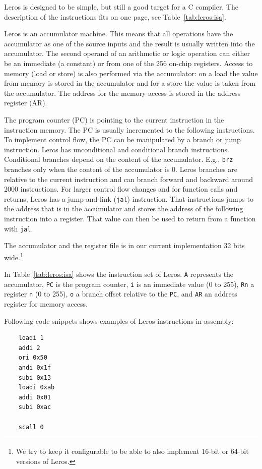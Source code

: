 \documentclass[%
    10pt,
    headinclude, footexclude,
    openright, %
    notitlepage,
    cleardoubleempty,
    headsepline,
    pointlessnumbers,
    bibtotoc, idxtotoc,
    ]{scrbook}
\newcommand{\code}[1]{{\lstinline[basicstyle=\small\ttfamily]{#1}}}
\begin{document}
Leros is designed to be simple, but still a good target for a C compiler.
The description of the instructions fits on one page, see Table~\ref{tab:leros:isa}.

Leros is an accumulator machine. This means that all operations
have the accumulator as one of the source inputs and the result is usually
written into the accumulator. The second operand of an arithmetic or logic
operation can either be an immediate (a constant) or from one of the 256
on-chip registers. Access to memory (load or store) is also performed via
the accumulator: on a load the value from memory is stored in the accumulator
and for a store the value is taken from the accumulator. The address for the
memory access is stored in the address register (AR).

The program counter (PC) is pointing to the current instruction in the
instruction memory. The PC is usually incremented to the following instructions.
To implement control flow, the PC can be manipulated by a branch
or jump instruction.
Leros has unconditional and conditional branch instructions.
Conditional branches depend on the content of the accumulator.
E.g., \code{brz} branches only when the content of the accumulator is 0.
Leros branches are relative to the current instruction and can branch forward
and backward around 2000 instructions.
For larger control flow changes and for function calls and returns,
Leros has a jump-and-link (\code{jal}) instruction.
That instructions jumps to the address that is in the accumulator and
stores the address of the following instruction into a register.
That value can then be used to return from a function with \code{jal}.

The accumulator and the register file is in our current implementation
32 bits wide.\footnote{We try to keep it configurable to be able to also
implement 16-bit or 64-bit versions of Leros.}


In Table~\ref{tab:leros:isa} shows the instruction set of Leros.
\code{A} represents the accumulator, \code{PC} is the program counter,
\code{i} is an immediate value (0 to 255), \code{Rn} a register
\code{n} (0 to 255), \code{o} a branch offset relative to the \code{PC},
and \code{AR} an address register for memory access.

Following code snippets shows examples of Leros instructions in assembly:

\begin{verbatim}
	loadi 1
	addi 2
	ori 0x50
	andi 0x1f
	subi 0x13
	loadi 0xab
	addi 0x01
	subi 0xac

	scall 0
\end{verbatim}
\end{document}
